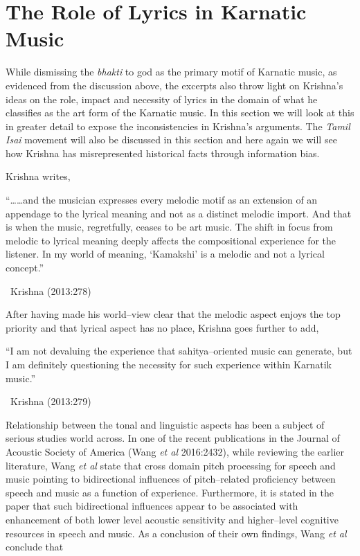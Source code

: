 \section*{The Role of Lyrics in Karnatic Music }

While dismissing the \textit{bhakti} to god as the primary motif of Karnatic music, as evidenced from the discussion above, the excerpts also throw light on Krishna’s ideas on the role, impact and necessity of lyrics in the domain of what he classifies as the art form of the Karnatic music. In this section we will look at this in greater detail to expose the inconsistencies in Krishna’s arguments. The \textit{Tamil Isai} movement will also be discussed in this section and here again we will see how Krishna has misrepresented historical facts through information bias.

Krishna writes,

\begin{myquote}
“……and the musician expresses every melodic motif as an extension of an appendage to the lyrical meaning and not as a distinct melodic import. And that is when the music, regretfully, ceases to be art music. The shift in focus from melodic to lyrical meaning deeply affects the compositional experience for the listener. In my world of meaning, ‘Kamakshi’ is a melodic and not a lyrical concept.” 

~\hfill Krishna (2013:278)
\end{myquote}

After having made his world–view clear that the melodic aspect enjoys the top priority and that lyrical aspect has no place, Krishna goes further to add,

\begin{myquote}
“I am not devaluing the experience that sahitya–oriented music can generate, but I am definitely questioning the necessity for such experience within Karnatik music.” 

~\hfill Krishna (2013:279)
\end{myquote}

Relationship between the tonal and linguistic aspects has been a subject of serious studies world across. In one of the recent publications in the Journal of Acoustic Society of America (Wang \textit{et al} 2016:2432), while reviewing the earlier literature, Wang \textit{et al} state that cross domain pitch processing for speech and music pointing to bidirectional influences of pitch–related proficiency between speech and music as a function of experience. Furthermore, it is stated in the paper that such bidirectional influences appear to be associated with enhancement of both lower level acoustic sensitivity and higher–level cognitive resources in speech and music. As a conclusion of their own findings, Wang \textit{et al} conclude that

